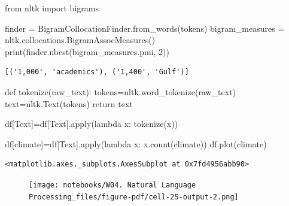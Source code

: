\documentclass[
  letterpaper,
  DIV=11,
  numbers=noendperiod]{scrreprt}
\newenvironment{Shaded}{\begin{snugshade}}{\end{snugshade}}
\newcommand{\BuiltInTok}[1]{\textcolor[rgb]{0.00,0.23,0.31}{#1}}
\newcommand{\ControlFlowTok}[1]{\textcolor[rgb]{0.00,0.23,0.31}{#1}}
\newcommand{\DecValTok}[1]{\textcolor[rgb]{0.68,0.00,0.00}{#1}}
\newcommand{\ImportTok}[1]{\textcolor[rgb]{0.00,0.46,0.62}{#1}}
\newcommand{\KeywordTok}[1]{\textcolor[rgb]{0.00,0.23,0.31}{#1}}
\newcommand{\NormalTok}[1]{\textcolor[rgb]{0.00,0.23,0.31}{#1}}
\newcommand{\OperatorTok}[1]{\textcolor[rgb]{0.37,0.37,0.37}{#1}}
\newcommand{\StringTok}[1]{\textcolor[rgb]{0.13,0.47,0.30}{#1}}
\begin{document}
\begin{Shaded}
\begin{Highlighting}[]
\ImportTok{from}\NormalTok{ nltk }\ImportTok{import}\NormalTok{ bigrams}

\NormalTok{finder }\OperatorTok{=}\NormalTok{ BigramCollocationFinder.from\_words(tokens)}
\NormalTok{bigram\_measures }\OperatorTok{=}\NormalTok{ nltk.collocations.BigramAssocMeasures()}
\BuiltInTok{print}\NormalTok{(finder.nbest(bigram\_measures.pmi, }\DecValTok{2}\NormalTok{))}
\end{Highlighting}
\end{Shaded}

\begin{verbatim}
[('1,000', 'academics'), ('1,400', 'Gulf')]
\end{verbatim}

\begin{Shaded}
\begin{Highlighting}[]
\KeywordTok{def}\NormalTok{ tokenize(raw\_text):}
\NormalTok{  tokens}\OperatorTok{=}\NormalTok{nltk.word\_tokenize(raw\_text)}
\NormalTok{  text}\OperatorTok{=}\NormalTok{nltk.Text(tokens)}
  \ControlFlowTok{return}\NormalTok{ text}

\NormalTok{df[}\StringTok{\textquotesingle{}Text\textquotesingle{}}\NormalTok{]}\OperatorTok{=}\NormalTok{df[}\StringTok{\textquotesingle{}Text\textquotesingle{}}\NormalTok{].}\BuiltInTok{apply}\NormalTok{(}\KeywordTok{lambda}\NormalTok{ x: tokenize(x))}
\end{Highlighting}
\end{Shaded}

\begin{Shaded}
\begin{Highlighting}[]
\NormalTok{df[}\StringTok{\textquotesingle{}climate\textquotesingle{}}\NormalTok{]}\OperatorTok{=}\NormalTok{df[}\StringTok{\textquotesingle{}Text\textquotesingle{}}\NormalTok{].}\BuiltInTok{apply}\NormalTok{(}\KeywordTok{lambda}\NormalTok{ x: x.count(}\StringTok{\textquotesingle{}climate\textquotesingle{}}\NormalTok{))}
\NormalTok{df.plot(}\StringTok{\textquotesingle{}climate\textquotesingle{}}\NormalTok{)}
\end{Highlighting}
\end{Shaded}

\begin{verbatim}
<matplotlib.axes._subplots.AxesSubplot at 0x7fd4956abb90>
\end{verbatim}

\begin{figure}[H]

{\centering \texttt{[image: notebooks/W04. Natural Language Processing\_files/figure-pdf/cell-25-output-2.png]}

}

\end{figure}
\end{document}
